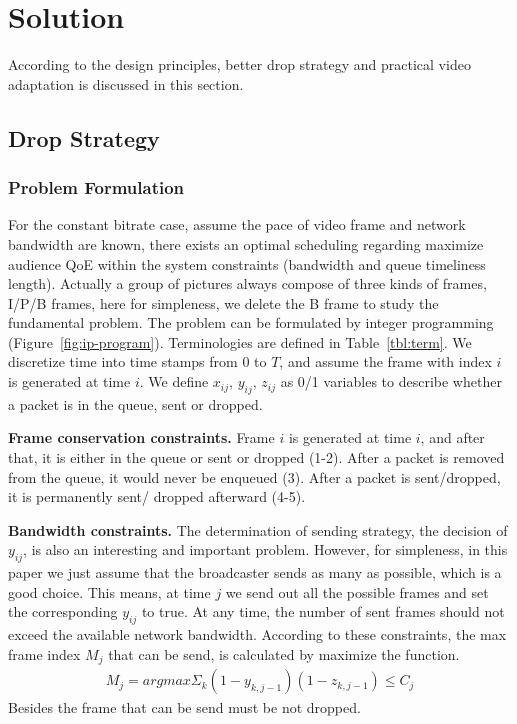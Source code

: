 \newcommand{\Mod}[1]{\text{ (mod } #1\text{)}}
\section{Solution}
According to the design principles, better drop strategy and practical video adaptation is discussed in this section.
\subsection{Drop Strategy}
\subsubsection{Problem Formulation}


For the constant bitrate case, assume the pace of video frame and network bandwidth are known, there exists an optimal scheduling regarding maximize audience QoE within the system constraints (bandwidth and queue timeliness length). Actually a group of pictures always compose of three kinds of frames, I/P/B frames, here for simpleness, we delete the B frame to study the fundamental problem. The problem can be formulated by integer programming (Figure~\ref{fig:ip-program}). Terminologies are defined in Table~\ref{tbl:term}. We discretize time into time stamps from $0$ to $T$, and assume the frame with index $i$ is generated at time $i$. We define $x_{ij}$, $y_{ij}$, $z_{ij}$ as 0/1 variables to describe whether a packet is in the queue, sent or dropped.

\textbf{Frame conservation constraints.}
Frame $i$ is generated at time $i$, and after that, it is either in the queue or sent or dropped (1-2).
After a packet is removed from the queue, it would never be enqueued (3).
After a packet is sent/dropped, it is permanently sent/ dropped afterward (4-5).

\textbf{Bandwidth constraints.}
The determination of sending strategy, the decision of $y_{ij}$, is also an interesting and important problem. However, for simpleness, in this paper we just assume that the broadcaster sends as many as possible, which is a good choice. This means, at time $j$ we send out all the possible frames and set the corresponding $y_{ij}$ to true. At any time, the number of sent frames should not exceed the available network bandwidth. According to these constraints, the max frame index $M_{j}$ that can be send, is calculated by maximize the function.
\begin{align}
M_j = argmax \Sigma_k (1-y_{k,j-1})(1-z_{k,j-1}) \leq C_{j}
\end{align}
Besides the frame that can be send must be not dropped.

